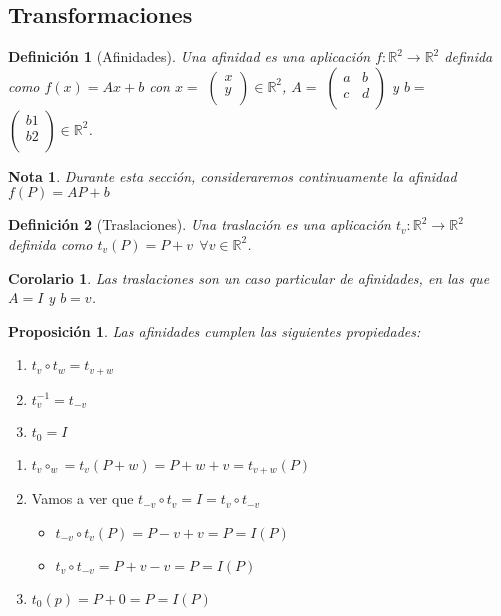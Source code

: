 \documentclass[11pt, a4paper]{article}
\makeatletter
\newif\IfInSansMode
\let\oldsf\sffamily
\renewcommand*{\sffamily}{\oldsf\mathversion{sans}\InSansModetrue}
\let\oldnorm\normalfont
\renewcommand*{\normalfont}{\oldnorm\InSansModefalse\mathversion{normal}}
\renewenvironment{proof}[1][\proofname] {\vspace{-15pt}\par\pushQED{\qed}\normalfont\topsep6\p@\@plus6\p@\relax\trivlist\item[\hskip\labelsep\it#1\@addpunct{.}]\ignorespaces}{\popQED\endtrivlist\@endpefalse}
\newcommand{\R}{\mathbb{R}}
\renewenvironment{proof}[1][\proofname] {\par\pushQED{\qed}\normalfont\topsep6\p@\@plus6\p@\relax\trivlist\item[\hskip\labelsep\itshape\sffamily#1\@addpunct{.}]\ignorespaces}{\popQED\endtrivlist\@endpefalse}
\theoremstyle{theorem-style}
\newtheorem{nprop}{Proposición}[section]
\newtheorem{ncor}{Corolario}[section]
\theoremstyle{definition-style}
\newtheorem{ndef}{Definición}[section]
\theoremstyle{remark-style}
\newtheorem*{nota}{Nota}
\theoremstyle{example-style}
\newenvironment{nlist}
{\begin{enumerate}
    \renewcommand\labelenumi{(\emph{\roman{enumi})}}}
  {\end{enumerate}}
\makeatother
\begin{document}
\subsection{Transformaciones}

\begin{ndef}[Afinidades]
  Una afinidad es una aplicación $f : \R^2 \rightarrow \R^2$ definida como $f(x) = Ax + b$ con $x =$ $\begin{pmatrix}
    x\\
    y\\
  \end{pmatrix} \in \R^2$, $A =$ $\begin{pmatrix}
    a & b\\
    c & d\\
  \end{pmatrix}$
  y $b =$ $\begin{pmatrix}
    b1\\
    b2\\
  \end{pmatrix} \in \R^2$.
\end{ndef}

\begin{nota}
  Durante esta sección, consideraremos continuamente la afinidad $f(P) = AP + b $
\end{nota}

\begin{ndef}[Traslaciones]
  Una traslación es una aplicación $t_v: \R^2 \rightarrow \R^2$ definida como $t_v(P) = P + v \ \ \forall v \in \R^2$.
\end{ndef}

\begin{ncor}
    \item Las traslaciones son un caso particular de afinidades, en las que $A = I$ y $b = v$.
\end{ncor}

\begin{nprop}
  Las afinidades cumplen las siguientes propiedades:
  \begin{nlist}
  \item $t_v \circ t_w = t_{v+w}$
  \item $t_{v}^{-1} = t_{-v}$
  \item $t_0 = I$
  \end{nlist}
\end{nprop}
\begin{proof}\hfill
  \begin{nlist}
  \item $t_v \circ_w = t_v(P+w) = P+w+v = t_{v+w}(P)$
  \item Vamos a ver que $t_{-v}\circ t_v = I = t_v \circ t_{-v}$
    \begin{itemize}
    \item $t_{-v}\circ t_v (P) = P-v+v = P = I(P)$
    \item $t_v\circ t_{-v} = P+v-v = P = I(P)$
    \end{itemize}
  \item $t_0(p) = P +0 = P = I(P)$
  \end{nlist}
\end{proof}
\end{document}
